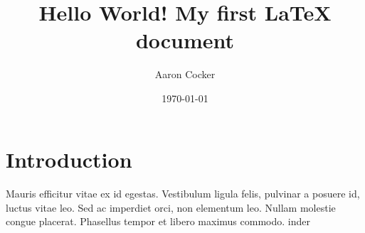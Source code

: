 \documentclass[a4paper,12pt]{article}
\begin{document}
\title{Hello World! My first LaTeX document}
\author{Aaron Cocker}
\date{\today}
\maketitle

\section{Introduction}

\paragraph{}
Mauris efficitur vitae ex id egestas. Vestibulum ligula felis, pulvinar a posuere id, luctus vitae leo. Sed ac imperdiet orci, non elementum leo. Nullam molestie congue placerat. Phasellus tempor et libero maximus commodo.
inder
\end{document}
